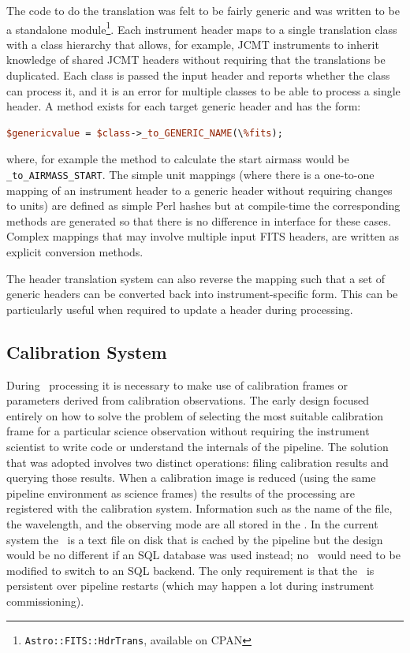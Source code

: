 \documentclass[final,authoryear,5p,times,twocolumn]{elsarticle}
\begin{document}
The code to do the translation was felt to be fairly generic and was
written to be a standalone
module\footnote{\texttt{Astro::FITS::HdrTrans}, available on
  CPAN}. Each instrument header maps to a single translation class
with a class hierarchy that allows, for example, JCMT instruments to
inherit knowledge of shared JCMT headers without requiring that the
translations be duplicated. Each class is passed the input header and
reports whether the class can process it, and it is an error for multiple
classes to be able to process a single header. A method exists for each
target generic header and has the form:

\begin{lstlisting}[language=perl]
$genericvalue = $class->_to_GENERIC_NAME(\%fits);
\end{lstlisting}

where, for example the method to calculate the start airmass would be
\texttt{\_to\_AIRMASS\_START}. The simple unit mappings (where there
is a one-to-one mapping of an instrument header to a generic header
without requiring changes to units) are defined as simple Perl hashes
but at compile-time the corresponding methods are generated so that
there is no difference in interface for these cases. Complex mappings
that may involve multiple input FITS headers, are written as explicit
conversion methods.

The header translation system can also reverse the mapping such that a
set of generic headers can be converted back into instrument-specific
form. This can be particularly useful when required to update a header
during processing.

\subsection{Calibration System}

During \Frame\ processing it is necessary to make use of calibration
frames or parameters derived from calibration observations. The early
design focused entirely on how to solve the problem of selecting the
most suitable calibration frame for a particular science observation
without requiring the instrument scientist to write code or understand
the internals of the pipeline. The solution that was adopted involves
two distinct operations: filing calibration results and querying those results.
When a calibration image is reduced (using the same pipeline
environment as science frames) the results of the processing are
registered with the calibration system. Information such as the name
of the file, the wavelength, and the observing mode are all stored in the \Index.
In the current system the \Index\ is a text file on disk that is cached by
the pipeline but the design would be no different if an SQL database
was used instead; no \primitives\ would need to be modified to switch
to an SQL backend.  The only requirement is that the \Index\ is
persistent over pipeline restarts (which may happen a lot during
instrument commissioning).
\end{document}
